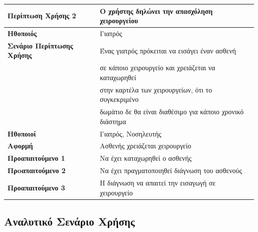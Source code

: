 \documentclass{article}
\newcommand\T{\rule{0pt}{2.6ex}}       %
\newcommand\B{\rule[-1.2ex]{0pt}{0pt}}
\begin{document}
\begin{center}
     \begin{tabular}{|l|l|}
     \hline
      \textbf{Περίπτωση Χρήσης 2} & Ο χρήστης δηλώνει την απασχόληση χειρουργείου \T\B \\ 
      \hline
      \textbf{Ηθοποιός} & Γιατρός \T\B \\
      \hline
      \textbf{Σενάριο Περίπτωσης Χρήσης} & Ένας γιατρός πρόκειται να εισάγει έναν ασθενή \T \\& σε κάποιο χειρουργείο και χρειάζεται να καταχωρηθεί\\& στην καρτέλα των χειρουργείων, ότι το συγκεκριμένο\\& δωμάτιο δε θα είναι διαθέσιμο για κάποιο χρονικό διάστημα \B \\
      \hline
      \textbf{Ηθοποιοί} & Γιατρός, Νοσηλευτής \T\B \\
      \hline
      \textbf{Αφορμή} & Ασθενής χρειάζεται χειρουργείο \T\B \\
      \hline
      \textbf{Προαπαιτούμενο 1} & Να έχει καταχωρηθεί ο ασθενής \T\B \\
      \hline
      \textbf{Πρoαπαιτούμενο 2} & Να έχει πραγματοποιηθεί διάγνωση του ασθενούς \T\B \\
      \hline
      \textbf{Προαπαιτούμενο 3} & Η διάγνωση να απαιτεί την εισαγωγή σε χειρουργείο \T\B \\
      \hline
     \end{tabular}
 \end{center}
 
 \subsection{Αναλυτικό Σενάριο Χρήσης}
 
\end{document}
